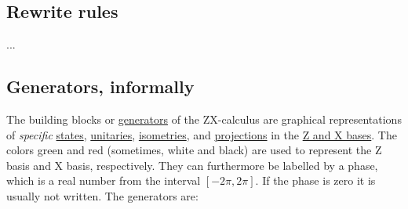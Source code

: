 \documentclass[a4paper, 12pt]{article}
\begin{document}
\subsection{Rewrite rules}
...

\subsection{Generators, informally}

The building blocks or \underline{generators} of the ZX-calculus are graphical
representations of \emph{specific} \underline{states}, \underline{unitaries},
\underline{isometries}, and \underline{projections} in the \underline{Z and X
  bases}.
The colors green and red (sometimes, white and black) are used to represent the
Z basis and X basis, respectively.
They can furthermore be labelled by a phase, which is a real number from the
interval $[-2\pi, 2\pi]$.
If the phase is zero it is usually not written.
The generators are:
\end{document}
